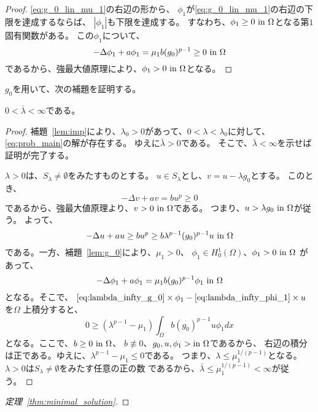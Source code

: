 \begin{proof}
 \eqref{eq:g_0_lin_mu_1}の右辺の形から、
 $\phi_1$が\eqref{eq:g_0_lin_mu_1}の右辺の下限を達成するならば、
 $\left| \phi_1 \right|$も下限を達成する。
 すなわち、$\phi_1 \geq 0 ~\text{in}~ \Omega$となる第$1$固有関数がある。
 この$\phi_1$について、
 \[
  - \Delta \phi_1 + a \phi_1 = \mu_1 b (g_0)^{p-1} \geq 0 ~\text{in}~ \Omega
 \]
 であるから、強最大値原理により、$\phi_1 > 0 ~\text{in}~ \Omega$となる。
 \qedhere
\end{proof}

$g_0$を用いて、次の補題を証明する。

\begin{lem}
 $0 < \bar{\lambda} < \infty$である。
\end{lem}

\begin{proof}
補題~\ref{lem:imp}により、$\lambda_0 > 0$があって、$0 < \lambda <
 \lambda_0$に対して、\ref{eq:prob_main}の解が存在する。
ゆえに$\bar{\lambda} > 0$である。
そこで、$\bar{\lambda} < \infty$を示せば証明が完了する。

$\lambda > 0$は、$S_\lambda \neq \emptyset$をみたすものとする。
$u \in S_\lambda$とし、$v = u - \lambda g_0$とする。
このとき、
\[
 -\Delta v + av = bu^p \geq 0
\]
であるから、強最大値原理より、$v > 0 ~\text{in}~ \Omega$である。
つまり、$u > \lambda g_0 ~\text{in}~ \Omega$が従う。
よって、
\begin{equation}
 - \Delta u + au \geq bu^p \geq b \lambda^{p-1} (g_0)^{p-1} u ~\text{in}~
  \Omega \label{eq:lambda_infty_g_0} 
\end{equation}
である。一方、補題~\ref{lem:g_0}により、$\mu_1 > 0$、
$\phi_1 \in H_0^1(\Omega)$、$\phi_1 > 0 ~\text{in}~ \Omega$
があって、
\begin{equation}
 -\Delta \phi_1 + a \phi_1 = \mu_1 b (g_0)^{p-1} \phi_1 ~\text{in}~ \Omega 
  \label{eq:lambda_infty_phi_1} 
\end{equation}
となる。そこで、
 $\text{\eqref{eq:lambda_infty_g_0}} \times \phi_1 - 
 \text{\eqref{eq:lambda_infty_phi_1}} \times u $を$\Omega$
 上積分すると、
 \[
  0 \geq (\lambda^{p-1} - \mu_1) \int_\Omega b(g_0)^{p-1} u \phi_1 dx
 \]
 となる。ここで、$b \geq 0 ~\text{in}~ \Omega$、
 $b \not \equiv 0$、$g_0, u, \phi_1 > \text{in}~ \Omega$であるから、
 右辺の積分は正である。ゆえに、$\lambda^{p-1} - \mu_1 \leq 0$である。
 つまり、$\lambda \leq \mu_1^{1/(p-1)}$となる。
 $\lambda > 0$は$S_\lambda \neq \emptyset$をみたす任意の正の数
 であるから、$\bar{\lambda} \leq \mu_1 ^{1/(p-1)} < \infty$が従う。
 \qedhere
\end{proof}

\begin{proof}[定理~\ref{thm:minimal_solution}]
 
\end{proof}

